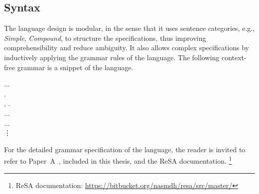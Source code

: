 \subsection*{Syntax}
The language design is modular, in the sense that it uses sentence categories, e.g., \textit{Simple}, \textit{Compound}, to structure the specifications, thus improving comprehensibility and reduce ambiguity. It also allows complex specifications by inductively applying the grammar rules of the language. The following context-free grammar is a snippet of the \resa{} language. 
\begin{bnf*}
	{ \bnfor {}\bnfor{} ...}\\
	{ .} \\%
	{, .} \\%
	{\bnfor ...} \\%
	{  \bnfor...} \\%
	\vdots
\end{bnf*}
For the detailed grammar specification of the language, the reader is invited to refer to Paper~A~\cite{Mahmud2015ReSA:Systems}, included in this thesis, and the ReSA documentation. 
\footnote{ReSA documentation:  \url{https://bitbucket.org/nasmdh/resa/src/master/} }
